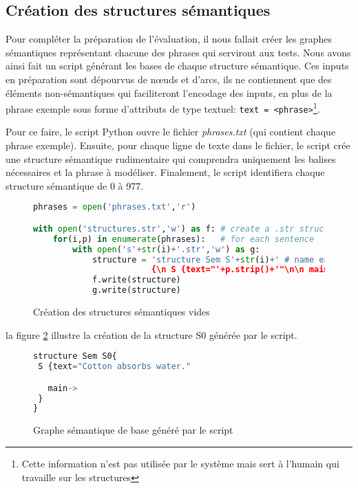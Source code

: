 \subsection{Création des structures sémantiques}\label{sec:pythonstruc}

Pour compléter la préparation de l'évaluation, il nous fallait créer les graphes sémantiques représentant chacune des phrases qui serviront aux tests. Nous avons ainsi fait un script générant les bases de chaque structure sémantique. Ces inputs en préparation sont dépourvus de n\oe{}uds et d'arcs, ils ne contiennent que des éléments non-sémantiques qui faciliteront l'encodage des inputs, en plus de la phrase exemple sous forme d'attributs de type textuel: \texttt{text = <phrase>}\footnote{Cette information n'est pas utilisée par le système mais sert à l'humain qui travaille sur les structures}.

Pour ce faire, le script Python ouvre le fichier \emph{phrases.txt} (qui contient chaque phrase exemple). Ensuite, pour chaque ligne de texte dans le fichier, le script crée une structure sémantique rudimentaire qui comprendra uniquement les balises nécessaires et la phrase à modéliser. Finalement, le script identifiera chaque structure sémantique de 0 à 977.

\begin{figure}[htb]
  \caption{Création des structures sémantiques vides}
	\label{structurepython}
\begin{lstlisting}[language=Python]
phrases = open('phrases.txt','r')

with open('structures.str','w') as f: # create a .str structure
    for(i,p) in enumerate(phrases):   # for each sentence
        with open('s'+str(i)+'.str','w') as g:
            structure = 'structure Sem S'+str(i)+' # name each structure by enumeration
						{\n S {text="'+p.strip()+'"\n\n main-> \n }\n}' #insert as text the sentence
            f.write(structure)
            g.write(structure)
\end{lstlisting}
\end{figure}

la figure \ref{fig:RSem0} illustre la création de la structure S0 générée par le script.

\begin{figure}[htb]
  \caption{Graphe sémantique de base généré par le script}
	\label{fig:RSem0}
\begin{lstlisting}[language=Python]
structure Sem S0{
 S {text="Cotton absorbs water."

   main-> 
 }
}
\end{lstlisting}
\end{figure}


